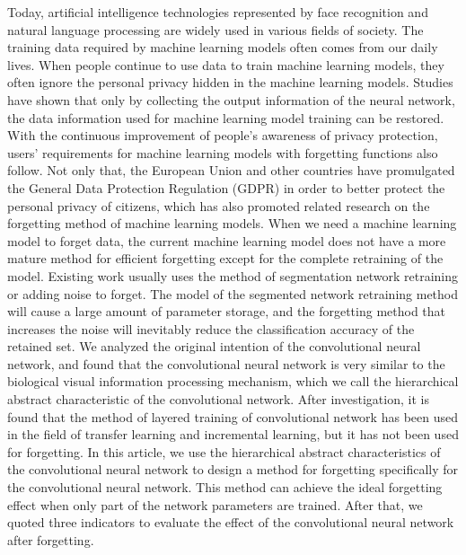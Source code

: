 \begin{abstract*}
  Today, artificial intelligence technologies represented by face recognition and natural language processing are widely used in various fields of society. 
  The training data required by machine learning models often comes from our daily lives.
  When people continue to use data to train machine learning models, they often ignore the personal privacy hidden in the machine learning models.
  Studies have shown that only by collecting the output information of the neural network, the data information used for machine learning model training can be restored. 
  With the continuous improvement of people's awareness of privacy protection, users' requirements for machine learning models with forgetting functions also follow.
  Not only that, the European Union and other countries have promulgated the General Data Protection Regulation (GDPR) in order to better protect the personal privacy of citizens, 
  which has also promoted related research on the forgetting method of machine learning models.
  When we need a machine learning model to forget data, the current machine learning model does not have a more mature method for efficient forgetting except for the complete retraining of the model.
  Existing work usually uses the method of segmentation network retraining or adding noise to forget. The model of the segmented network retraining method will cause a large amount of parameter storage, 
  and the forgetting method that increases the noise will inevitably reduce the classification accuracy of the retained set.
  We analyzed the original intention of the convolutional neural network, and found that the convolutional neural network is very similar to the biological visual information processing mechanism, 
  which we call the hierarchical abstract characteristic of the convolutional network.
  After investigation, it is found that the method of layered training of convolutional network has been used in the field of transfer learning and incremental learning, but it has not been used for forgetting.
  In this article, we use the hierarchical abstract characteristics of the convolutional neural network to design a method for forgetting specifically for the convolutional neural network.
  This method can achieve the ideal forgetting effect when only part of the network parameters are trained.
  After that, we quoted three indicators to evaluate the effect of the convolutional neural network after forgetting.


\end{abstract*}
